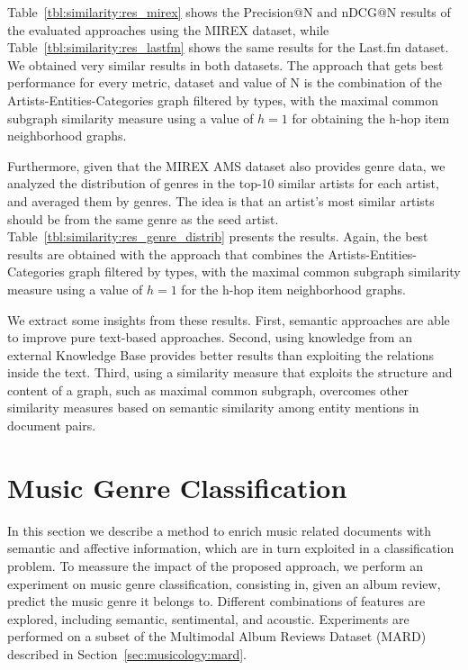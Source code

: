 Table~\ref{tbl:similarity:res_mirex} shows the Precision@N and nDCG@N results of the evaluated approaches using the MIREX dataset, while Table~\ref{tbl:similarity:res_lastfm} shows the same results for the Last.fm dataset. We obtained very similar results in both datasets. The approach that gets best performance for every metric, dataset and value of N is the combination of the Artists-Entities-Categories graph filtered by types, with the maximal common subgraph similarity measure using a value of $h=1$ for obtaining the h-hop item neighborhood graphs.

Furthermore, given that the MIREX AMS dataset also provides genre data, we analyzed the distribution of genres in the top-10 similar artists for each artist, and averaged them by genres. The idea is that an artist's most similar artists should be from the same genre as the seed artist.
Table~\ref{tbl:similarity:res_genre_distrib} presents the results. Again, the best results are obtained with the approach that combines the Artists-Entities-Categories graph filtered by types, with the maximal common subgraph similarity measure using a value of $h=1$ for the h-hop item neighborhood graphs.

We extract some insights from these results. First, semantic approaches are able to improve pure text-based approaches. Second, using knowledge from an external Knowledge Base provides better results than exploiting the relations inside the text. Third, using a similarity measure that exploits the structure and content of a graph, such as maximal common subgraph, overcomes other similarity measures based on semantic similarity among entity mentions in document pairs.


\section{Music Genre Classification}\label{sec:similarity:classification}

In this section we describe a method to enrich music related documents with semantic and affective information, which are in turn exploited in a classification problem. To meassure the impact of the proposed approach, we perform an experiment on music genre classification, consisting in, given an album review, predict the music genre it belongs to. Different combinations of features are explored, including semantic, sentimental, and acoustic. Experiments are performed on a subset of the Multimodal Album Reviews Dataset (MARD) described in Section~\ref{sec:musicology:mard}.


